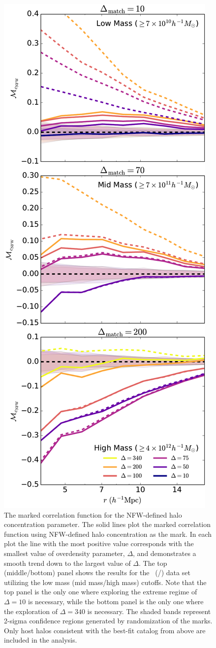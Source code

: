 \documentclass[usenatbib]{mnras}
\begin{document}

\begin{figure}
	\centering
	\includegraphics[width=.4\textwidth]{match_mcf_cNFW.pdf}
	\caption{The marked correlation function for the NFW-defined halo concentration parameter. The solid lines plot the marked correlation function using NFW-defined halo concentration as the mark. In each plot the line with the most 
positive value corresponds with the smallest value of overdensity parameter, 
$\Delta$, and demonstrates a smooth trend down to the largest value of 
$\Delta$. The top (middle/bottom) panel shows the results for the
\simA \ (\simB /\simC) data set utilizing the low mass (mid mass/high mass) cutoffs. Note
that the top panel is the only one where exploring the extreme regime of $\Delta = 10$ is
necessary, while the bottom panel is the only one where the exploration of $\Delta = 340$
is necessary. The shaded bands represent 2-sigma confidence regions generated by randomization of the marks. Only host halos consistent with the best-fit catalog from above are included in the analysis.}
	\label{fig:hvm_mcf_cnfw}
\end{figure}
\end{document}

